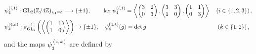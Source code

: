\begin{equation} \label{definitionoflevel21fiberings}
\begin{split}
&\psi_4^{(i,1)} : \operatorname{GL}_2(\mathbb{Z}/4\mathbb{Z})_{\chi_4 = \varepsilon} \longrightarrow \{ \pm 1 \}, \quad\quad\, \ker \psi_4^{(i,1)} = \left\langle \begin{pmatrix} 3 & 2 \\ 0 & 3 \end{pmatrix}, \begin{pmatrix} 3 & 3 \\ 1 & 0 \end{pmatrix}, \begin{pmatrix} 1 & 1 \\ 0 & 3 \end{pmatrix} \right\rangle \quad \left( i \in \{1, 2, 3 \} \right), \\
&\psi_4^{(4,k)} : \pi_{\operatorname{GL}_2}^{-1} \left( \left\langle \begin{pmatrix} 1 & 1 \\ 1 & 0 \end{pmatrix} \right\rangle \right) \rightarrow \{ \pm 1 \}, \quad \psi_4^{(4,k)}(g) = \det g \quad\quad\quad\quad\quad\quad\quad\quad\quad\quad\quad\quad\, \left( k \in \{ 1, 2 \} \right),
\end{split}
\end{equation}
and the maps $\psi_3^{(i,k)}$ are defined by

